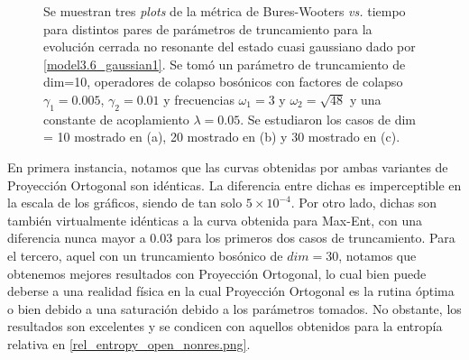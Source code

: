 \documentclass{report} %
\numberwithin{equation}{section}
\begin{document}
\begin{figure}
\caption{Se muestran tres \textit{plots} de la métrica de Bures-Wooters \textit{vs.} tiempo para distintos pares de parámetros de truncamiento para la evolución cerrada no resonante del estado cuasi gaussiano dado por \eqref{model3.6_gaussian1}. Se tomó un parámetro de truncamiento de dim=10, operadores de colapso bosónicos con factores de colapso $\gamma_1 = 0.005$, $\gamma_2 = 0.01$ y frecuencias $\omega_1 = 3$ y $\omega_2 = \sqrt{48}$ y una constante de acoplamiento $\lambda = 0.05$. Se estudiaron los casos de dim = 10 mostrado en (a), 20 mostrado en (b) y 30 mostrado en (c). }
\label{bxb-closed-res/bxs_open_nr.png}
\end{figure}

En primera instancia, notamos que las curvas obtenidas por ambas variantes de Proyección Ortogonal son idénticas. La diferencia entre dichas es imperceptible en la escala de los gráficos, siendo de tan solo $5 \times 10^{-4}$. Por otro lado, dichas son también virtualmente idénticas a la curva obtenida para Max-Ent, con una diferencia nunca mayor a $0.03$ para los primeros dos casos de truncamiento. Para el tercero, aquel con un truncamiento bosónico de $dim=30$, notamos que obtenemos mejores resultados con Proyección Ortogonal, lo cual bien puede deberse a una realidad física en la cual Proyección Ortogonal es la rutina óptima o bien debido a una saturación debido a los parámetros tomados. No obstante, los resultados son excelentes y se condicen con aquellos obtenidos para la entropía relativa en \ref{rel_entropy_open_nonres.png}.
\end{document}
